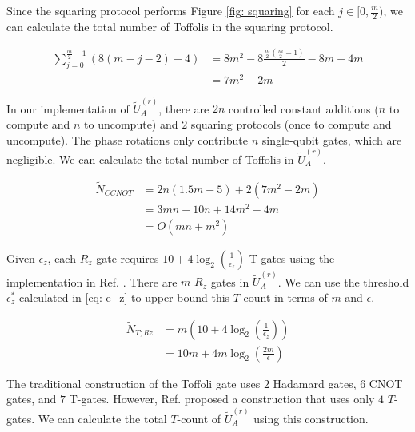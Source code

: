 Since the squaring protocol performs Figure \ref{fig: squaring} for each $j \in [0, \frac{m}{2})$, we can calculate the total number of Toffolis in the squaring protocol.

\begin{equation}
    \begin{split}
        \sum_{j = 0}^{\frac{m}{2} - 1} (8(m - j - 2) + 4) &= 8m^2 - 8\frac{\frac{m}{2}(\frac{m}{2} - 1)}{2} - 8m + 4m \\
        &= 7m^2 - 2m
    \end{split}
\end{equation}

In our implementation of $\tilde{U}_A^{(r)}$, there are $2n$ controlled constant additions ($n$ to compute and $n$ to uncompute) and $2$ squaring protocols (once to compute and uncompute). The phase rotations only contribute $n$ single-qubit gates, which are negligible. We can calculate the total number of Toffolis in $\tilde{U}_A^{(r)}$.

\begin{equation}
    \begin{split}
        \tilde{N}_{CCNOT} &= 2n(1.5m - 5) + 2(7m^2 - 2m) \\
        &= 3mn - 10n + 14m^2 - 4m \\
        &= O(mn + m^2) \label{eq: toffolis}
    \end{split}
\end{equation}

Given $\epsilon_z$, each $R_z$ gate requires $10 + 4\log_2(\frac{1}{\epsilon_z})$ T-gates using the implementation in Ref. \cite{Rz}. There are $m$ $R_z$ gates in $\tilde{U}_A^{(r)}$. We can use the threshold $\epsilon_z^*$ calculated in \eqref{eq: e_z} to upper-bound this $T$-count in terms of $m$ and $\epsilon$.

\begin{equation}
    \begin{split}
        \tilde{N}_{T; Rz} &= m(10 + 4\log_2(\frac{1}{\epsilon_z})) \\
        &= 10m + 4m\log_2(\frac{2m}{\epsilon})
    \end{split}
\end{equation}

The traditional construction of the Toffoli gate uses $2$ Hadamard gates, $6$ CNOT gates, and $7$ T-gates. However, Ref. \cite{Toffoli} proposed a construction that uses only $4$ $T$-gates. We can calculate the total $T$-count of $\tilde{U}_A^{(r)}$ using this construction.

